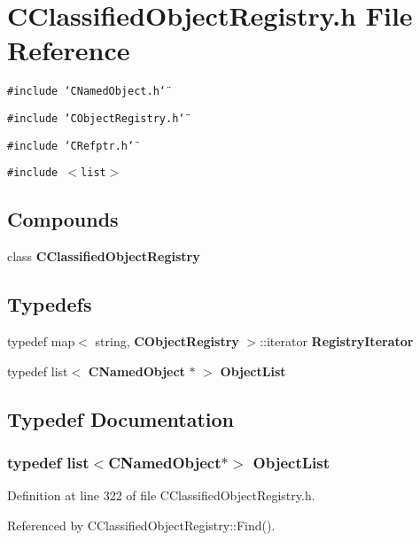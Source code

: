 \section{CClassified\-Object\-Registry.h File Reference}
\label{CClassifiedObjectRegistry_8h}
{\tt \#include \char`\"{}CNamed\-Object.h\char`\"{}}\par
{\tt \#include \char`\"{}CObject\-Registry.h\char`\"{}}\par
{\tt \#include \char`\"{}CRefptr.h\char`\"{}}\par
{\tt \#include $<$list$>$}\par
\subsection*{Compounds}
\begin{CompactItemize}
\item 
class {\bf CClassified\-Object\-Registry}
\end{CompactItemize}
\subsection*{Typedefs}
\begin{CompactItemize}
\item 
typedef map$<$ string, {\bf CObject\-Registry} $>$::iterator {\bf Registry\-Iterator}
\item 
typedef list$<$ {\bf CNamed\-Object} $\ast$ $>$ {\bf Object\-List}
\end{CompactItemize}


\subsection{Typedef Documentation}
\subsubsection{\setlength{\rightskip}{0pt plus 5cm}typedef list$<${\bf CNamed\-Object}$\ast$$>$ Object\-List}\label{CClassifiedObjectRegistry_8h_a1}




Definition at line 322 of file CClassified\-Object\-Registry.h.

Referenced by CClassified\-Object\-Registry::Find().
